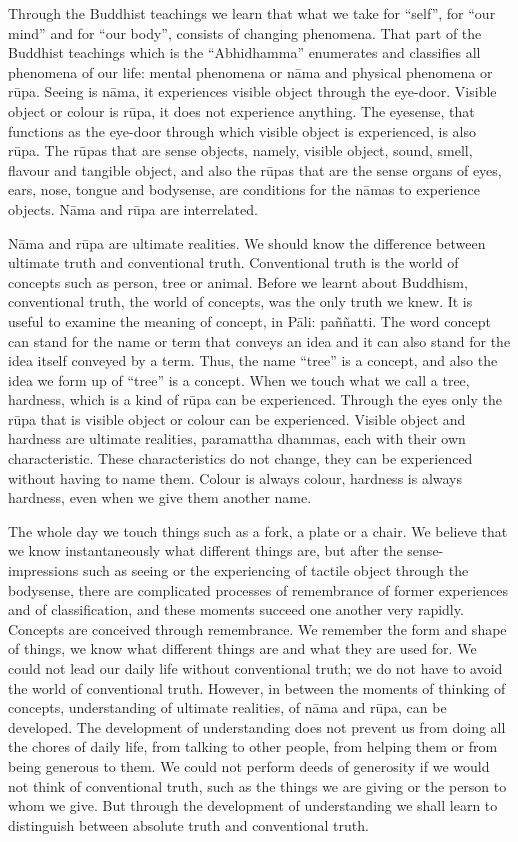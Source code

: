 \documentclass{book}
\begin{document}
Through the Buddhist teachings we learn that what we take for ``self'',
for ``our mind'' and for ``our body'', consists of changing phenomena.
That part of the Buddhist teachings which is the ``Abhi\-dhamma''
enumerates and classifies all phenomena of our life: mental phenomena
or n{\=a}ma and physical phenomena or r\=upa. Seeing is n{\=a}ma, it
experiences visible object through the eye-door. Visible object or
colour is r\=upa, it does not experience anything. The eyesense, that
functions as the eye-door through which visible object is
experienced, is also r\=upa. The r\=upas that are sense objects,
namely, visible object, sound, smell, flavour and tangible object, and
also the r\=upas that are the sense organs of eyes, ears, nose, tongue
and bodysense, are conditions for the n{\=a}mas to experience objects.
N{\=a}ma and r\=upa are interrelated. 

N{\=a}ma and r\=upa are ultimate realities. We should know the
difference between ultimate truth and conventional truth. Conventional
truth is the world of concepts such as person, tree or animal. Before
we learnt about Buddhism, conventional truth, the world of concepts,
was the only truth we knew. It is useful to examine the meaning of
concept, in P{\=a}li: pa\~n\~natti. The word concept can stand for the
name or term that conveys an idea and it can also stand for the idea
itself conveyed by a term. Thus, the name ``tree'' is a concept, and
also the idea we form up of ``tree'' is a concept. When we touch what
we call a tree, hardness, which is a kind of r\=upa can be experienced.
Through the eyes only the r\=upa that is visible object or colour can
be experienced. Visible object and hardness are ultimate realities,
paramattha dhammas, each with their own characteristic. These
characteristics do not change, they can be experienced without having
to name them. Colour is always colour, hardness is always hardness,
even when we give them another name. 

The whole day we touch things such as a fork, a plate or a chair. We
believe that we know instantaneously what different things are, but
after the sense-impressions such as seeing or the experiencing of
tactile object through the bodysense, there are complicated processes
of remembrance of former experiences and of classification, and these
moments succeed one another very rapidly. Concepts are conceived
through remembrance. We remember the form and shape of things, we know
what different things are and what they are used for. We could not lead
our daily life without conventional truth; we do not have to avoid
the world of conventional truth. However, in between the moments of
thinking of concepts, understanding of ultimate realities, of n{\=a}ma
and r\=upa, can be developed. The development of understanding does not
prevent us from doing all the chores of daily life, from talking to
other people, from helping them or from being generous to them. We
could not perform deeds of generosity if we would not think of
conventional truth, such as the things we are giving or the person
to whom we give. But through the development of understanding we shall
learn to distinguish between absolute truth and conventional truth. 
\end{document}

